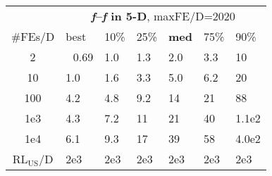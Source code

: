 \begin{tabular}{c|llllll}
 & \multicolumn{6}{|c}{\textbf{\textit{f}\raisebox{-0.35ex}{1}--\textit{f}\raisebox{-0.35ex}{24} in 5-D}, maxFE/D=2020}\\
\#FEs/D & best & 10\% & 25\% & \textbf{med} & 75\% & 90\%\\
2 & ~\,0.69 & \hspace*{1ex}1.0 & \hspace*{1ex}1.3 & \hspace*{1ex}2.0 & \hspace*{1ex}3.3 & 10\\
10 & \hspace*{1ex}1.0 & \hspace*{1ex}1.6 & \hspace*{1ex}3.3 & \hspace*{1ex}5.0 & \hspace*{1ex}6.2 & 20\\
100 & \hspace*{1ex}4.2 & \hspace*{1ex}4.8 & \hspace*{1ex}9.2 & 14 & 21 & 88\\
1e3 & \hspace*{1ex}4.3 & \hspace*{1ex}7.2 & 11 & 21 & 40 & 1.1e2\\
1e4 & \hspace*{1ex}6.1 & \hspace*{1ex}9.3 & 17 & 39 & 58 & 4.0e2\\
$\text{RL}_{\text{US}}$/D & 2e3 & 2e3 & 2e3 & 2e3 & 2e3 & 2e3
\end{tabular}
